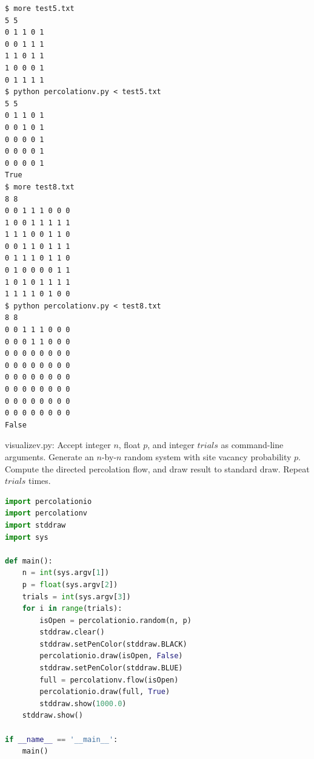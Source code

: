 \documentclass[8pt,a4paper,compress,handout]{beamer}
\begin{document}
\begin{frame}[fragile]
\begin{lstlisting}[language={}]
$ more test5.txt 
5 5
0 1 1 0 1
0 0 1 1 1
1 1 0 1 1
1 0 0 0 1
0 1 1 1 1
$ python percolationv.py < test5.txt 
5 5
0 1 1 0 1 
0 0 1 0 1 
0 0 0 0 1 
0 0 0 0 1 
0 0 0 0 1 
True
$ more test8.txt 
8 8
0 0 1 1 1 0 0 0
1 0 0 1 1 1 1 1
1 1 1 0 0 1 1 0
0 0 1 1 0 1 1 1
0 1 1 1 0 1 1 0
0 1 0 0 0 0 1 1
1 0 1 0 1 1 1 1
1 1 1 1 0 1 0 0
$ python percolationv.py < test8.txt 
8 8
0 0 1 1 1 0 0 0 
0 0 0 1 1 0 0 0 
0 0 0 0 0 0 0 0 
0 0 0 0 0 0 0 0 
0 0 0 0 0 0 0 0 
0 0 0 0 0 0 0 0 
0 0 0 0 0 0 0 0 
0 0 0 0 0 0 0 0 
False
\end{lstlisting}
\end{frame}

\begin{frame}[fragile]
\begin{framed}
\tiny visualizev.py: Accept integer $n$, float $p$, and integer $trials$ as command-line arguments. Generate an $n$-by-$n$ random system with site vacancy probability $p$. Compute the directed percolation flow, and draw result to standard draw. Repeat $trials$ times.
\end{framed}

\begin{lstlisting}[language=Python]
import percolationio
import percolationv
import stddraw
import sys

def main():
    n = int(sys.argv[1])
    p = float(sys.argv[2])
    trials = int(sys.argv[3])
    for i in range(trials):
        isOpen = percolationio.random(n, p)
        stddraw.clear()
        stddraw.setPenColor(stddraw.BLACK)
        percolationio.draw(isOpen, False)
        stddraw.setPenColor(stddraw.BLUE)
        full = percolationv.flow(isOpen)
        percolationio.draw(full, True)
        stddraw.show(1000.0)
    stddraw.show()

if __name__ == '__main__':
    main()
\end{lstlisting}
\end{frame}
\end{document}

